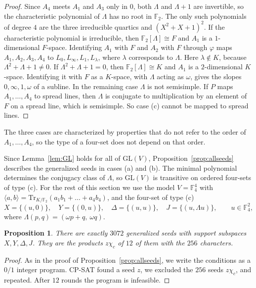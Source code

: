 \documentclass[11pt]{amsart}
\newtheorem{proposition}[theorem]{Proposition}
\theoremstyle{definition}
\newcommand{\F}{\mathbb{F}}
\newcommand{\GL}{\mathrm{GL}}
\newcommand{\Tr}{\mathrm{Tr}}
\begin{document}
\begin{proof}
Since $A_4$ meets $A_1$ and $A_3$ only in $0$, both $\Lambda$ and $\Lambda+1$ are invertible, so the characteristic polynomial of $\Lambda$ has no root in $\F_2$. The only such polynomials of degree $4$ are the three irreducible quartics and $(X^2+X+1)^2$. If the characteristic polynomial is irreducible, then $\F_2[\Lambda]\cong F$ and $A_1$ is a $1$-dimensional $F$-space. Identifying $A_1$ with $F$ and $A_2$ with $F$ through $\varphi$ maps $A_1,A_2,A_3,A_4$ to $L_0,L_\infty,L_1,L_\lambda$, where $\lambda$ corresponds to $\Lambda$. Here $\lambda\notin K$, because $\Lambda^2+\Lambda+1\ne0$. If $\Lambda^2+\Lambda+1=0$, then $\F_2[\Lambda]\cong K$ and $A_1$ is a $2$-dimensional $K$-space. Identifying it with $F$ as a $K$-space, with $\Lambda$ acting as $\omega$, gives the slopes $0,\infty,1,\omega$ of a subline. In the remaining case $\Lambda$ is not semisimple. If $P$ maps $A_1,\dots,A_4$ to spread lines, then $\Lambda$ is conjugate to multiplication by an element of $F$ on a spread line, which is semisimple. So case (c) cannot be mapped to spread lines.
\end{proof}

The three cases are characterized by properties that do not refer to the order of $A_1,\dots,A_4$, so the type of a four-set does not depend on that order.

Since Lemma~\ref{lem:GL} holds for all of $\GL(V)$, Proposition~\ref{prop:allseeds} describes the generalized seeds in cases (a) and (b). The minimal polynomial determines the conjugacy class of $\Lambda$, so $\GL(V)$ is transitive on ordered four-sets of type (c). For the rest of this section we use the model $V=\F_4^4$ with $\langle a,b\rangle=\Tr_{K/\F_2}(a_1b_1+\dots+a_4b_4)$, and the four-set of type (c)
\[
X=\{(u,0)\},\quad Y=\{(0,u)\},\quad \Delta=\{(u,u)\},\quad J=\{(u,\Lambda u)\},\qquad u\in\F_4^2,
\]
where $\Lambda(p,q)=(\omega p+q,\ \omega q)$.

\begin{proposition}\label{prop:jordanseeds}
There are exactly $3072$ generalized seeds with support subspaces $X,Y,\Delta,J$. They are the products $z\chi_c$ of $12$ of them with the $256$ characters.
\end{proposition}

\begin{proof}
As in the proof of Proposition~\ref{prop:allseeds}, we write the conditions as a $0/1$ integer program. CP-SAT found a seed $z$, we excluded the $256$ seeds $z\chi_c$, and repeated. After $12$ rounds the program is infeasible.
\end{proof}
\end{document}
